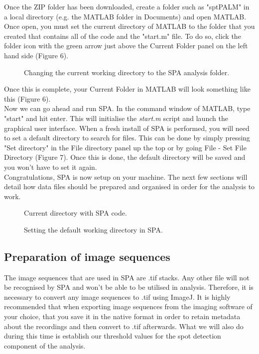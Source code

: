 \documentclass[11pt]{article} %
\begin{document}
Once the ZIP folder has been downloaded, create a folder such as "sptPALM" in a local directory (e.g. the MATLAB folder in Documents) and open MATLAB. Once open, you must set the current directory of MATLAB to the folder that you created that contains all of the code and the "start.m" file. To do so, click the folder icon with the green arrow just above the Current Folder panel on the left hand side (Figure 6).

	\begin{figure}[H]
	\caption{Changing the current working directory to the SPA analysis folder.}
	\end{figure}

Once this is complete, your Current Folder in MATLAB will look something like this (Figure 6). \\ 

Now we can go ahead and run SPA. In the command window of MATLAB, type "start" and hit enter. This will initialise the \textit{start.m} script and launch the graphical user interface. When a fresh install of SPA is performed, you will need to set a default directory to search for files. This can be done by simply pressing "Set directory" in the File directory panel up the top or by going File - Set File Directory (Figure 7). Once this is done, the default directory will be saved and you won't have to set it again. \\

Congratulations, SPA is now setup on your machine. The next few sections will detail how data files should be prepared and organised in order for the analysis to work.

	\begin{figure}[H]
	\caption{Current directory with SPA code.}
	\end{figure}

	\begin{figure}[H]
	\caption{Setting the default working directory in SPA.}
	\end{figure}

\subsection{Preparation of image sequences}

The image sequences that are used in SPA are .tif stacks. Any other file will not be recognised by SPA and won't be able to be utilised in analysis. Therefore, it is necessary to convert any image sequences to .tif using ImageJ. It is highly recommended that when exporting image sequences from the imaging software of your choice, that you save it in the native format in order to retain metadata about the recordings and then convert to .tif afterwards. What we will also do during this time is establish our threshold values for the spot detection component of the analysis.\\
\end{document}
